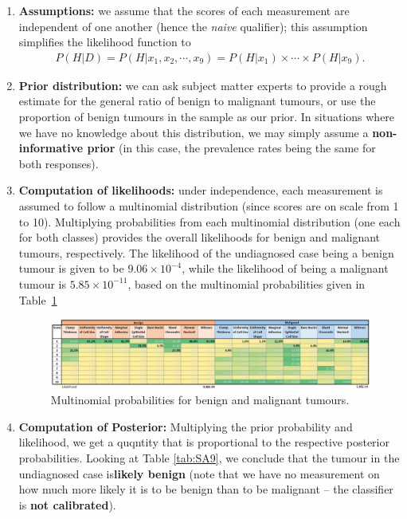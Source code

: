 \begin{enumerate}[noitemsep]
    \item \textbf{Assumptions:} we assume that the scores of each measurement are independent of one another (hence the \textit{naive} qualifier); this assumption simplifies the likelihood function to
    \begin{align*}
        P(H|D)=P(H|x_{1},x_{2},\cdots,x_{9})=P(H|x_{1})\times \cdots\times P(H|x_{9}).
    \end{align*}
    \item \textbf{Prior distribution:} we can ask subject matter experts to provide a rough estimate for the general ratio of benign to malignant tumours, or use the proportion of benign tumours in the sample as our prior. In situations where we have no knowledge about this distribution, we may simply assume a \textbf{non-informative prior} (in this case, the prevalence rates being the same for both responses). 
    
    \item \textbf{Computation of likelihoods:} under independence, each measurement is assumed to follow a multinomial distribution (since scores are on scale from 1 to 10). Multiplying probabilities from each multinomial distribution (one each for both classes) provides the overall likelihoods for benign and malignant tumours, respectively. The likelihood of the undiagnosed case being a benign tumour is given to be $9.06\times 10^{-4}$, while the likelihood of being a malignant tumour is $5.85\times 10^{-11}$, based on the multinomial probabilities given in Table~\ref{fig:testA13}
    
    \begin{figure}[!t]
    \centering
      \includegraphics[width=1\linewidth]{images/SA/testA13.png}
      \caption[\small Multinomial probabilities for benign and malignant tumours]{\small Multinomial probabilities for benign and malignant tumours.}
      \label{fig:testA13}
    \end{figure}
    
    
    \item \textbf{Computation of Posterior:} Multiplying the prior probability and likelihood, we get a quqntity that is proportional to the respective posterior probabilities. Looking at Table \ref{tab:SA9}, we conclude that the tumour in the undiagnosed case is\textbf{likely benign} (note that we have no measurement on how much more likely it is to be benign than to be malignant -- the classifier is \textbf{not calibrated}).
    

\end{enumerate}
